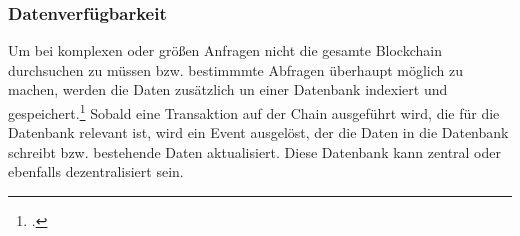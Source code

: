 \subsubsection{Datenverfügbarkeit}
\label{sec:Datenverfügbarkeit}
Um bei komplexen oder größen Anfragen nicht die gesamte Blockchain durchsuchen zu müssen bzw. bestimmmte Abfragen überhaupt möglich zu machen, werden die Daten zusätzlich un einer Datenbank indexiert und gespeichert.\footcites[Vgl. hierzu und im Folgenden][]{w32}[]{w33}
Sobald eine Transaktion auf der Chain ausgeführt wird, die für die Datenbank relevant ist, wird ein Event ausgelöst, der die Daten in die Datenbank schreibt bzw. bestehende Daten aktualisiert.
Diese Datenbank kann zentral oder ebenfalls dezentralisiert sein.